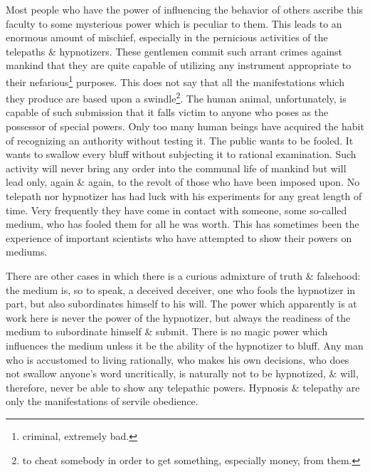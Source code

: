 \documentclass{article}
\begin{document}
Most people who have the power of influencing the behavior of others ascribe this faculty to some mysterious power which is peculiar to them. This leads to an enormous amount of mischief, especially in the pernicious activities of the telepaths \& hypnotizers. These gentlemen commit such arrant crimes against mankind that they are quite capable of utilizing any instrument appropriate to their nefarious\footnote{criminal, extremely bad.} purposes. This does not say that all the manifestations which they produce are based upon a swindle\footnote{to cheat somebody in order to get something, especially money, from them.}. The human animal, unfortunately, is capable of such submission that it falls victim to anyone who poses as the possessor of special powers. Only too many human beings have acquired the habit of recognizing an authority without testing it. The public wants to be fooled. It wants to swallow every bluff without subjecting it to rational examination. Such activity will never bring any order into the communal life of mankind but will lead only, again \& again, to the revolt of those who have been imposed upon. No telepath nor hypnotizer has had luck with his experiments for any great length of time. Very frequently they have come in contact with someone, some so-called medium, who has fooled them for all he was worth. This has sometimes been the experience of important scientists who have attempted to show their powers on mediums.

There are other cases in which there is a curious admixture of truth \& falsehood: the medium is, so to speak, a deceived deceiver, one who fools the hypnotizer in part, but also subordinates himself to his will. The power which apparently is at work here is never the power of the hypnotizer, but always the readiness of the medium to subordinate himself \& submit. There is no magic power which influences the medium unless it be the ability of the hypnotizer to bluff. Any man who is accustomed to living rationally, who makes his own decisions, who does not swallow anyone's word uncritically, is naturally not to be hypnotized, \& will, therefore, never be able to show any telepathic powers. Hypnosis \& telepathy are only the manifestations of servile obedience.
\end{document}
